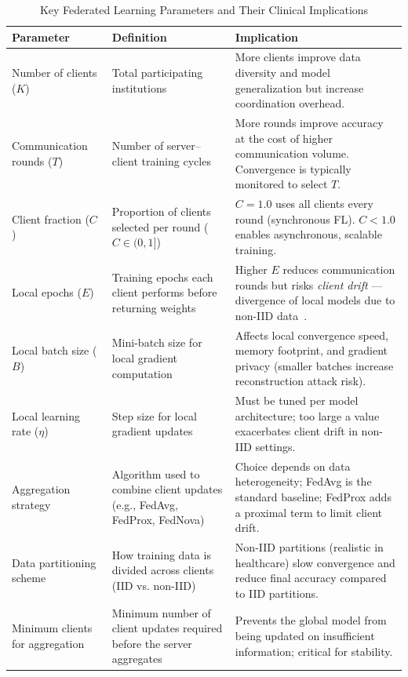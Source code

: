 \begin{table}[!htbp]
\centering
\caption{Key Federated Learning Parameters and Their Clinical Implications}
\label{tab:fl_params}
\begin{tabular}{|p{3.2cm}|p{4.2cm}|p{5.8cm}|}
\hline
\textbf{Parameter} & \textbf{Definition} & \textbf{Implication} \\
\hline
Number of clients ($K$)
    & Total participating institutions
    & More clients improve data diversity and model generalization but
      increase coordination overhead. \\
\hline
Communication rounds ($T$)
    & Number of server--client training cycles
    & More rounds improve accuracy at the cost of higher communication
      volume. Convergence is typically monitored to select $T$. \\
\hline
Client fraction ($C$)
    & Proportion of clients selected per round ($C \in (0,1]$)
    & $C = 1.0$ uses all clients every round (synchronous FL).
      $C < 1.0$ enables asynchronous, scalable training. \\
\hline
Local epochs ($E$)
    & Training epochs each client performs before returning weights
    & Higher $E$ reduces communication rounds but risks \textit{client drift}
      — divergence of local models due to non-IID data~\cite{li2020}. \\
\hline
Local batch size ($B$)
    & Mini-batch size for local gradient computation
    & Affects local convergence speed, memory footprint, and gradient
      privacy (smaller batches increase reconstruction attack risk). \\
\hline
Local learning rate ($\eta$)
    & Step size for local gradient updates
    & Must be tuned per model architecture; too large a value exacerbates
      client drift in non-IID settings. \\
\hline
Aggregation strategy
    & Algorithm used to combine client updates (e.g., FedAvg, FedProx,
      FedNova)
    & Choice depends on data heterogeneity; FedAvg is the standard baseline;
      FedProx adds a proximal term to limit client drift. \\
\hline
Data partitioning scheme
    & How training data is divided across clients (IID vs. non-IID)
    & Non-IID partitions (realistic in healthcare) slow convergence and
      reduce final accuracy compared to IID partitions. \\
\hline
Minimum clients for aggregation
    & Minimum number of client updates required before the server aggregates
    & Prevents the global model from being updated on insufficient
      information; critical for stability. \\
\hline
\end{tabular}
\end{table}
 
